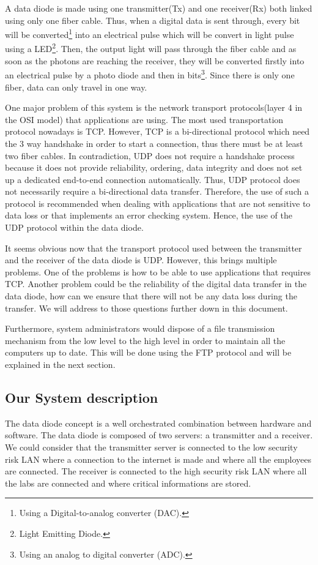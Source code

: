 \documentclass[a4paper,10pt]{article}
\begin{document}
A data diode is made using one transmitter(Tx) and one receiver(Rx) both linked using only one fiber cable. Thus, when a digital data is sent through, every bit will be converted\footnote{Using a Digital-to-analog converter (DAC).} into an electrical pulse which will be convert in light pulse using a LED\footnote{Light Emitting Diode.}. Then, the output light will pass through the fiber cable and as soon as the photons are reaching the receiver, they will be converted firstly into an electrical pulse by a photo diode and then in bits\footnote{Using an analog to digital converter (ADC).}. Since there is only one fiber, data can only travel in one way.

One major problem of this system is the network transport protocols(layer 4 in the OSI model) that applications are using. The most used transportation protocol nowadays is TCP. However, TCP is a bi-directional protocol which need the 3 way handshake in order to start a connection, thus there must be at least two fiber cables. In contradiction, UDP does not require a handshake process because it does not provide reliability, ordering, data integrity and does not set up a dedicated end-to-end connection automatically. Thus, UDP protocol does not necessarily require a bi-directional data transfer. Therefore, the use of such a protocol is recommended when dealing with applications that are not sensitive to data loss or that implements an error checking system. Hence, the use of the UDP protocol within the data diode.

It seems obvious now that the transport protocol used between the transmitter and the receiver of the data diode is UDP. However, this brings multiple problems. One of the problems is how to be able to use applications that requires TCP. Another problem could be the reliability of the digital data transfer in the data diode, how can we ensure that there will not be any data loss during the transfer. We will address to those questions further down in this document.\bigskip

Furthermore, system administrators would dispose of a file transmission mechanism from the low level to the high level in order to maintain all the computers up to date. This will be done using the FTP protocol and will be explained in the next section.

\subsection{Our System description}
The data diode concept is a well orchestrated combination between hardware and software. The data diode is composed of two servers: a transmitter and a receiver. We could consider that the transmitter server is connected to the low security risk LAN where a connection to the internet is made and where all the employees are connected. The receiver is connected to the high security risk LAN where all the labs are connected and where critical informations are stored.
\end{document}
